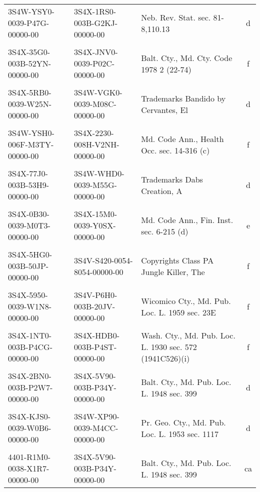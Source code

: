\documentclass[10pt, letterpaper]{article}
\begin{document}
\begin{spacing}{1.0}
\begin{table}[H]
\begin{adjustwidth}{-0.225in}{}
\begin{tabular}{llp{2in}c}
            3S4W-YSY0-0039-P47G-00000-00 & 3S4X-1RS0-003B-G2KJ-00000-00 & Neb. Rev. Stat. sec. 81-8,110.13 & d\\
            & & &\\[-6pt]
            3S4X-35G0-003B-52YN-00000-00 & 3S4X-JNV0-0039-P02C-00000-00 & Balt. Cty., Md. Cty. Code 1978 2 (22-74) & f\\
            & & &\\[-6pt]
            3S4X-5RB0-0039-W25N-00000-00 & 3S4W-VGK0-0039-M08C-00000-00 & Trademarks Bandido by Cervantes, El & d\\
            & & &\\[-6pt]
            3S4W-YSH0-006F-M3TY-00000-00 & 3S4X-2230-008H-V2NH-00000-00 & Md. Code Ann., Health Occ. sec. 14-316 (c) & f\\
            & & &\\[-6pt]
            3S4X-77J0-003B-53H9-00000-00 & 3S4W-WHD0-0039-M55G-00000-00 & Trademarks Dabs Creation, A & d\\
            & & &\\[-6pt]
            3S4X-0B30-0039-M0T3-00000-00 & 3S4X-15M0-0039-Y0SX-00000-00 & Md. Code Ann., Fin. Inst. sec. 6-215 (d) & e\\
            & & &\\[-6pt]
            3S4X-5HG0-003B-50JP-00000-00 & 3S4V-S420-0054-8054-00000-00 & Copyrights Class PA Jungle Killer, The & f\\
            & & &\\[-6pt]
            3S4X-5950-0039-W1N8-00000-00 & 3S4V-P6H0-003B-20JV-00000-00 & Wicomico Cty., Md. Pub. Loc. L. 1959 sec. 23E & f\\
            & & &\\[-6pt]
            3S4X-1NT0-003B-P4CG-00000-00 & 3S4X-HDB0-003B-P4ST-00000-00 & Wash. Cty., Md. Pub. Loc. L. 1930 sec. 572 (1941C526)(i) & f\\
            & & &\\[-6pt]
            3S4X-2BN0-003B-P2W7-00000-00 & 3S4X-5V90-003B-P34Y-00000-00 & Balt. Cty., Md. Pub. Loc. L. 1948 sec. 399 & d\\
            & & &\\[-6pt]
            3S4X-KJS0-0039-W0B6-00000-00 & 3S4W-XP90-0039-M4CC-00000-00 & Pr. Geo. Cty., Md. Pub. Loc. L. 1953 sec. 1117 & d\\
            & & &\\[-6pt]
            4401-R1M0-0038-X1R7-00000-00 & 3S4X-5V90-003B-P34Y-00000-00 & Balt. Cty., Md. Pub. Loc. L. 1948 sec. 399 & ca\\

\end{tabular}
\end{adjustwidth}
\end{table}
\end{spacing}
\end{document}
